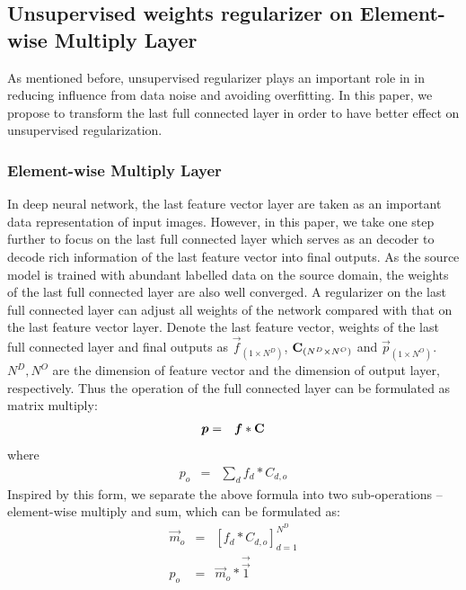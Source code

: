\documentclass[runningheads]{llncs}
\begin{document}
\subsection{Unsupervised weights regularizer on Element-wise Multiply Layer}
\label{Section:Unsupervised weights regularizer on Element-wise Multiply Layer}

As mentioned before, unsupervised regularizer plays an important role in in reducing influence from data noise and avoiding overfitting. In this paper, we propose to transform the last full connected layer in order to have better effect on unsupervised regularization.

\subsubsection{Element-wise Multiply Layer}
\label{section:Element-wise Multiply Layer}
In deep neural network, the last feature vector layer are taken as an important data representation of input images. However, in this paper, we take one step further to focus on the last full connected layer which serves as an decoder to decode rich information of the last feature vector into final outputs. As the source model is trained with abundant labelled data on the source domain, the weights of the last full connected layer are also well converged. A regularizer on the last full connected layer can adjust all weights of the network compared with that on the last feature vector layer. Denote the last feature vector, weights of the last full connected layer and final outputs as $\vec{f}_{(1\times N^{D})}$, ${\bf C}_{(N^{D}\times N^{O})}$ and $\vec{p}_{(1\times N^{O})}$. $ N^{D}, N^{O}$ are the dimension of feature vector and the dimension of output layer, respectively. Thus the operation of the full connected layer can be formulated as matrix multiply:
\begin{eqnarray}
  \vec{p} &=& \vec{f}*{\bf C} \label{eq:matrixmultiply}
\end{eqnarray}
where
\begin{eqnarray}
  p_{o} &=&  \sum_{d}{f_{d}*C_{d,o}}
\end{eqnarray}
Inspired by this form, we separate the above formula into two sub-operations -- element-wise multiply and sum, which can be formulated as:
\begin{eqnarray}
  \vec{m}_{o} &=& [f_{d} * C_{d,o}]^{N^{D}}_{d=1} \label{eq:elementwisemultiply} \\
  p_{o} &=& \vec{m}_{o}*\vec{\overrightarrow{1}}
\end{eqnarray}
\end{document}
